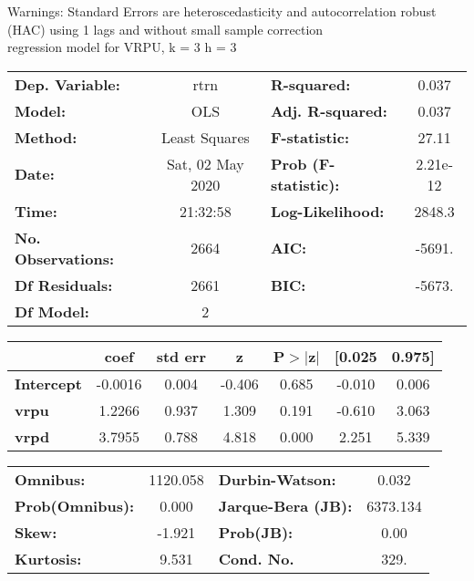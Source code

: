 Warnings: \newline
 [1] Standard Errors are heteroscedasticity and autocorrelation robust (HAC) using 1 lags and without small sample correction\\ 

regression model for VRPU, k = 3 h = 3\begin{center}
\begin{tabular}{lclc}
\toprule
\textbf{Dep. Variable:}    &       rtrn       & \textbf{  R-squared:         } &     0.037   \\
\textbf{Model:}            &       OLS        & \textbf{  Adj. R-squared:    } &     0.037   \\
\textbf{Method:}           &  Least Squares   & \textbf{  F-statistic:       } &     27.11   \\
\textbf{Date:}             & Sat, 02 May 2020 & \textbf{  Prob (F-statistic):} &  2.21e-12   \\
\textbf{Time:}             &     21:32:58     & \textbf{  Log-Likelihood:    } &    2848.3   \\
\textbf{No. Observations:} &        2664      & \textbf{  AIC:               } &    -5691.   \\
\textbf{Df Residuals:}     &        2661      & \textbf{  BIC:               } &    -5673.   \\
\textbf{Df Model:}         &           2      & \textbf{                     } &             \\
\bottomrule
\end{tabular}
\begin{tabular}{lcccccc}
                   & \textbf{coef} & \textbf{std err} & \textbf{z} & \textbf{P$> |$z$|$} & \textbf{[0.025} & \textbf{0.975]}  \\
\midrule
\textbf{Intercept} &      -0.0016  &        0.004     &    -0.406  &         0.685        &       -0.010    &        0.006     \\
\textbf{vrpu}      &       1.2266  &        0.937     &     1.309  &         0.191        &       -0.610    &        3.063     \\
\textbf{vrpd}      &       3.7955  &        0.788     &     4.818  &         0.000        &        2.251    &        5.339     \\
\bottomrule
\end{tabular}
\begin{tabular}{lclc}
\textbf{Omnibus:}       & 1120.058 & \textbf{  Durbin-Watson:     } &    0.032  \\
\textbf{Prob(Omnibus):} &   0.000  & \textbf{  Jarque-Bera (JB):  } & 6373.134  \\
\textbf{Skew:}          &  -1.921  & \textbf{  Prob(JB):          } &     0.00  \\
\textbf{Kurtosis:}      &   9.531  & \textbf{  Cond. No.          } &     329.  \\
\bottomrule
\end{tabular}
\end{center}

